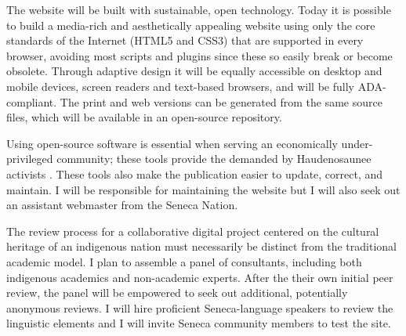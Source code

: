 \documentclass{neh}
\begin{document}
The website will be built with sustainable, open technology.
Today it is possible to build a media-rich and aesthetically appealing website
using only the core standards of the Internet (HTML5 and CSS3) that are
supported in every browser, avoiding most scripts and plugins since these so
easily break or become obsolete.
Through adaptive design it will be equally accessible on desktop and mobile
devices, screen readers and text-based browsers, and will be fully
ADA-compliant.
The print and web versions can be generated from the same source files, which
will be available in an open-source repository.

Using open-source software is essential when serving an economically
under-privileged community; these tools provide the
 demanded by Haudenosaunee activists 
\autocite{BasicCall}.
These tools also make the publication easier to update, correct, and maintain.
I will be responsible for maintaining the website but I will also seek out an
assistant webmaster from the Seneca Nation.

The review process for a collaborative digital project centered on the
cultural heritage of an indigenous nation must necessarily be distinct from
the traditional academic model.
I plan to assemble a panel of consultants, including both indigenous academics
and non-academic experts.
After the their own initial peer review, the panel will be empowered to seek
out additional, potentially anonymous reviews.
I will hire proficient Seneca-language speakers to review the linguistic
elements and I will invite Seneca community members to test the site.
\end{document}
